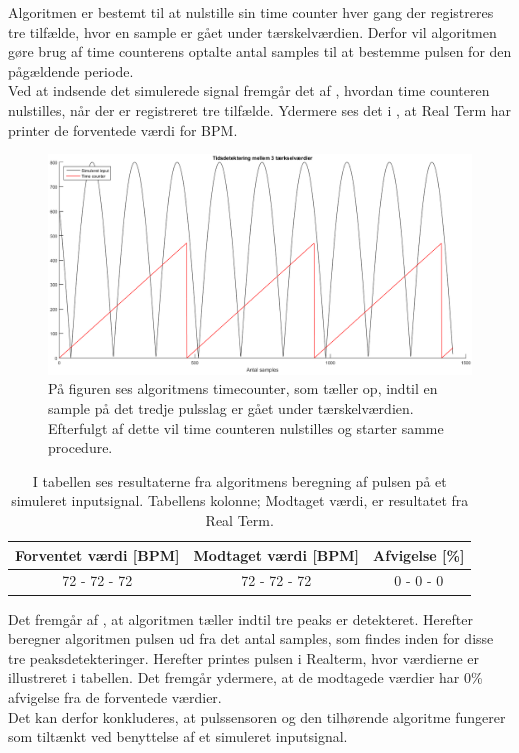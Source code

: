 Algoritmen er bestemt til at nulstille sin time counter hver gang der registreres tre tilfælde, hvor en sample er gået under tærskelværdien. Derfor vil algoritmen gøre brug af time counterens optalte antal samples til at bestemme pulsen for den pågældende periode. \\
Ved at indsende det simulerede signal fremgår det af , hvordan time counteren nulstilles, når der er registreret tre tilfælde. Ydermere ses det i , at Real Term har printer de forventede værdi for BPM.
\begin{figure}[H]
	\centering
	\includegraphics[scale=0.4]{figures/cDesign/timecounter_puls_pic.png}
	\caption{På figuren ses algoritmens timecounter, som tæller op, indtil en sample på det tredje pulsslag er gået under tærskelværdien. Efterfulgt af dette vil time counteren nulstilles og starter samme procedure.}
\label{fig:timecounter_puls_realterm}
\end{figure}
\begin{table}[H]
	\centering
	\begin{tabular}{ccc}
		\hline
		\rowcolor[HTML]{C0C0C0} 
		Forventet værdi [BPM] & Modtaget værdi [BPM] & Afvigelse [\%]\\ \hline
		72 - 72 - 72          & 72 - 72 - 72         & 0 - 0 - 0 \\ \hline
	\end{tabular}
	\caption{I tabellen ses resultaterne fra algoritmens beregning af pulsen på et simuleret inputsignal. Tabellens kolonne; Modtaget værdi, er resultatet fra Real Term.}
	\label{tab:test_puls_realterm}
\end{table} \vspace{-0.5cm}

Det fremgår af , at algoritmen tæller indtil tre peaks er detekteret. Herefter beregner algoritmen pulsen ud fra det antal samples, som findes inden for disse tre peaksdetekteringer. Herefter printes pulsen i Realterm, hvor værdierne er illustreret i tabellen. Det fremgår ydermere, at de modtagede værdier har 0\% afvigelse fra de forventede værdier. \\
Det kan derfor konkluderes, at pulssensoren og den tilhørende algoritme fungerer som tiltænkt ved benyttelse af et simuleret inputsignal. 

